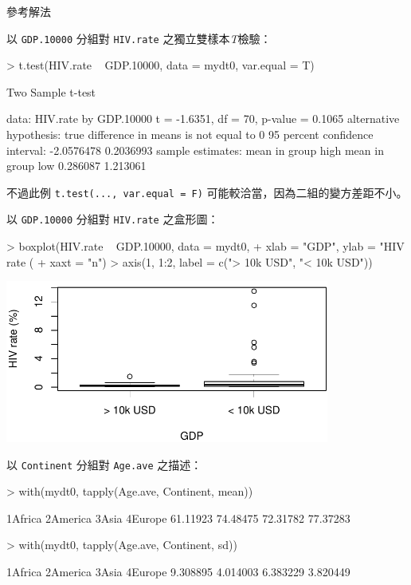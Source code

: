 \documentclass[12pt, aspectratio=43]{beamer}
\begin{document}
\begin{frame}{參考解法}
\framebreak

以 \verb+GDP.10000+ 分組對 \verb+HIV.rate+ 之獨立雙樣本\emph{T}檢驗：
\begin{RC}
> t.test(HIV.rate ~ GDP.10000, data = mydt0, var.equal = T)
\end{RC}
\begin{R}
	Two Sample t-test

data:  HIV.rate by GDP.10000
t = -1.6351, df = 70, p-value = 0.1065
alternative hypothesis: true difference in means is not equal to 0
95 percent confidence interval:
 -2.0576478  0.2036993
sample estimates:
mean in group high  mean in group low 
          0.286087           1.213061
\end{R}
不過此例 \verb+t.test(..., var.equal = F)+ 可能較洽當，因為二組的變方差距不小。

\framebreak

以 \verb+GDP.10000+ 分組對 \verb+HIV.rate+ 之盒形圖：
\begin{RC}
> boxplot(HIV.rate ~ GDP.10000, data = mydt0,
+         xlab = "GDP", ylab = "HIV rate (%
+         xaxt = "n")
> axis(1, 1:2, label = c("> 10k USD", "< 10k USD"))
\end{RC}
\begin{center}\includegraphics[width=0.8\textwidth]{Rplot-test-two-group.pdf}\end{center}

\framebreak

以 \verb+Continent+ 分組對 \verb+Age.ave+ 之描述：
\begin{RC}
> with(mydt0, {tapply(Age.ave, Continent, mean)})
\end{RC}
\begin{R}
 1Africa 2America    3Asia  4Europe 
61.11923 74.48475 72.31782 77.37283 
\end{R}
\begin{RC}
> with(mydt0, {tapply(Age.ave, Continent, sd)})
\end{RC}
\begin{R}
 1Africa 2America    3Asia  4Europe 
9.308895 4.014003 6.383229 3.820449
\end{R}


\end{frame}
\end{document}
